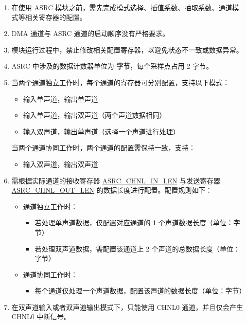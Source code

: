 \documentclass[main\_\_CN.tex]{subfiles}
\begin{document}
\begin{enumerate}
  \item 在使用 ASRC 模块之前，需先完成模式选择、插值系数、抽取系数、通道模式等相关寄存器的配置。
  \item DMA 通道与 ASRC 通道的启动顺序没有严格要求。
  \item 模块运行过程中，禁止修改相关配置寄存器，以避免状态不一致或数据异常。
  \item ASRC 中涉及的数据计数器单位为 \textbf{字节}，每个采样点占用 2 字节。

  \item 当两个通道独立工作时，每个通道的寄存器可分别配置，支持以下模式：
  \begin{itemize}
    \item 输入单声道，输出单声道
    \item 输入单声道，输出双声道（两个声道数据相同）
    \item 输入双声道，输出单声道（选择一个声道进行处理）
  \end{itemize}
  当两个通道协同工作时，两个通道的配置需保持一致，支持：
  \begin{itemize}
    \item 输入双声道，输出双声道
  \end{itemize}

  \item 需根据实际通道的接收寄存器 \hyperref[fielddesc:ASRCCHNL0INLEN]{ASRC\_CHNL\_IN\_LEN} 与发送寄存器 \hyperref[fielddesc:ASRCCHNL0OUTLEN]{ASRC\_CHNL\_OUT\_LEN} 的数据长度进行配置。配置规则如下：
  \begin{itemize}
    \item 通道独立工作时：
    \begin{itemize}
      \item 若处理单声道数据，仅配置对应通道的 1 个声道数据长度（单位：字节）
      \item 若处理双声道数据，需配置该通道上 2 个声道的总数据长度（单位：字节）
    \end{itemize}
    \item 通道协同工作时：
    \begin{itemize}
      \item 每个通道仅处理一个声道数据，配置该声道的数据长度（单位：字节）
    \end{itemize}
  \end{itemize}

  \item 在双声道输入或者双声道输出模式下，只能使用 CHNL0 通道，并且仅会产生 CHNL0 中断信号。


\end{enumerate}
\end{document}
